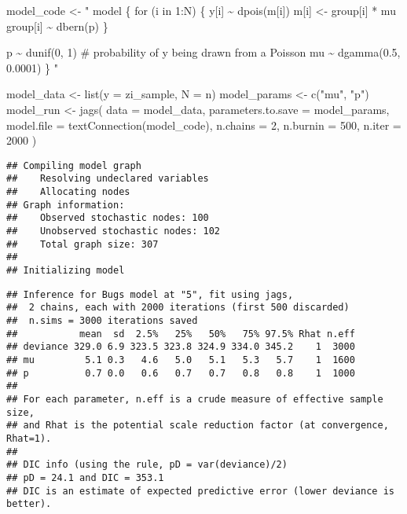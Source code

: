 \documentclass[
  oneside]{book}
\newenvironment{Shaded}{\begin{snugshade}}{\end{snugshade}}
\newcommand{\AttributeTok}[1]{\textcolor[rgb]{0.77,0.63,0.00}{#1}}
\newcommand{\DecValTok}[1]{\textcolor[rgb]{0.00,0.00,0.81}{#1}}
\newcommand{\FunctionTok}[1]{\textcolor[rgb]{0.00,0.00,0.00}{#1}}
\newcommand{\NormalTok}[1]{#1}
\newcommand{\OtherTok}[1]{\textcolor[rgb]{0.56,0.35,0.01}{#1}}
\newcommand{\SpecialCharTok}[1]{\textcolor[rgb]{0.00,0.00,0.00}{#1}}
\newcommand{\StringTok}[1]{\textcolor[rgb]{0.31,0.60,0.02}{#1}}
\begin{document}
\begin{Shaded}
\begin{Highlighting}[]
\NormalTok{model\_code }\OtherTok{\textless{}{-}} \StringTok{"}
\StringTok{model \{}
\StringTok{  for (i in 1:N) \{}
\StringTok{    y[i] \textasciitilde{} dpois(m[i])}
\StringTok{    m[i] \textless{}{-} group[i] * mu}
\StringTok{    group[i] \textasciitilde{} dbern(p)}
\StringTok{  \}}

\StringTok{  p \textasciitilde{} dunif(0, 1) \# probability of y being drawn from a Poisson}
\StringTok{  mu \textasciitilde{} dgamma(0.5, 0.0001)}
\StringTok{\}}
\StringTok{"}

\NormalTok{model\_data }\OtherTok{\textless{}{-}} \FunctionTok{list}\NormalTok{(}\AttributeTok{y =}\NormalTok{ zi\_sample, }\AttributeTok{N =}\NormalTok{ n)}
\NormalTok{model\_params }\OtherTok{\textless{}{-}} \FunctionTok{c}\NormalTok{(}\StringTok{"mu"}\NormalTok{, }\StringTok{"p"}\NormalTok{)}
\NormalTok{model\_run }\OtherTok{\textless{}{-}} \FunctionTok{jags}\NormalTok{(}
  \AttributeTok{data =}\NormalTok{ model\_data,}
  \AttributeTok{parameters.to.save =}\NormalTok{ model\_params,}
  \AttributeTok{model.file =} \FunctionTok{textConnection}\NormalTok{(model\_code),}
  \AttributeTok{n.chains =} \DecValTok{2}\NormalTok{, }\AttributeTok{n.burnin =} \DecValTok{500}\NormalTok{, }\AttributeTok{n.iter =} \DecValTok{2000}
\NormalTok{)}
\end{Highlighting}
\end{Shaded}

\begin{verbatim}
## Compiling model graph
##    Resolving undeclared variables
##    Allocating nodes
## Graph information:
##    Observed stochastic nodes: 100
##    Unobserved stochastic nodes: 102
##    Total graph size: 307
## 
## Initializing model
\end{verbatim}

\begin{Shaded}
\end{Shaded}

\begin{verbatim}
## Inference for Bugs model at "5", fit using jags,
##  2 chains, each with 2000 iterations (first 500 discarded)
##  n.sims = 3000 iterations saved
##           mean  sd  2.5%   25%   50%   75% 97.5% Rhat n.eff
## deviance 329.0 6.9 323.5 323.8 324.9 334.0 345.2    1  3000
## mu         5.1 0.3   4.6   5.0   5.1   5.3   5.7    1  1600
## p          0.7 0.0   0.6   0.7   0.7   0.8   0.8    1  1000
## 
## For each parameter, n.eff is a crude measure of effective sample size,
## and Rhat is the potential scale reduction factor (at convergence, Rhat=1).
## 
## DIC info (using the rule, pD = var(deviance)/2)
## pD = 24.1 and DIC = 353.1
## DIC is an estimate of expected predictive error (lower deviance is better).
\end{verbatim}
\end{document}

